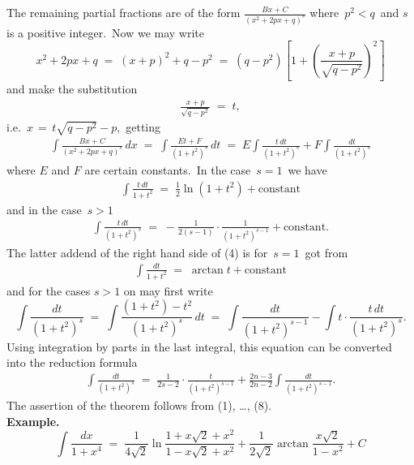 \documentclass[12pt]{article}
\theoremstyle{definition}
\begin{document}
The remaining partial fractions are of the form $\displaystyle\frac{Bx\!+\!C}{(x^2\!+\!2px\!+\!q)^s}$ where\, $p^2 < q$\, and $s$ is a positive integer.\, Now we may write 
$$x^2\!+\!2px\!+\!q \;=\; (x\!+\!p)^2\!+\!q\!-\!p^2 \;=\; (q\!-\!p^2)\!\left[1+\left(\!\frac{x\!+\!p}{\sqrt{q\!-\!p^2}}\!\right)^{\!2}\right]$$ and make the substitution
\begin{align}
\frac{x\!+\!p}{\sqrt{q\!-\!p^2}} \;=\; t,
\end{align}
i.e.\, $x \,=\, t\sqrt{q\!-\!p^2}\!-\!p$,\, getting
\begin{align}
\int\!\frac{Bx\!+\!C}{(x^2\!+\!2px\!+\!q)^s}\,dx \;=\; \int\!\frac{Et\!+\!F}{(1\!+\!t^2)^s}\,dt \;=\; 
E\!\int\!\frac{t\,dt}{(1\!+\!t^2)^s}+F\!\int\!\frac{dt}{(1\!+\!t^2)^s}
\end{align}
where $E$ and $F$ are certain constants.\, In the case \,$s = 1$\, we have
\begin{align}
\int\!\frac{t\,dt}{1\!+\!t^2} \;=\; \frac{1}{2}\ln(1\!+\!t^2)+\mbox{constant}
\end{align}
and in the case \,$s >1$
\begin{align}
\int\!\frac{t\,dt}{(1\!+\!t^2)^s} \;=\; -\frac{1}{2(s\!-\!1)}\!\cdot\!\frac{1}{(1\!+\!t^2)^{s-1}}+\mbox{constant}.
\end{align}
The latter addend of the right hand side of (4) is for\, $s = 1$\, got from
\begin{align}
\int\!\frac{dt}{1\!+\!t^2} \;=\; \arctan{t}+\mbox{constant}
\end{align}
and for the cases $s > 1$ on may first write 
$$\int\!\frac{dt}{(1\!+\!t^2)^s} \;=\; \int\!\frac{(1\!+\!t^2)\!-\!t^2}{(1\!+\!t^2)^s}\,dt \;=\;
\int\!\frac{dt}{(1\!+\!t^2)^{s-1}}-\int\!t\!\cdot\!\frac{t\,dt}{(1\!+\!t^2)^s}.$$ 
Using integration by parts in the last integral, this equation can be converted into the reduction formula
\begin{align}
\int\!\frac{dt}{(1\!+\!t^2)^s} \;=\; 
\frac{1}{2s\!-\!2}\!\cdot\!\frac{t}{(1\!+\!t^2)^{s-1}}+\frac{2n\!-\!3}{2n\!-\!2}\int\!\frac{dt}{(1\!+\!t^2)^{s-1}}.
\end{align}
The assertion of the theorem follows from (1), \ldots, (8).\\

\textbf{Example.}\, 
$$\int\!\frac{dx}{1\!+\!x^4} \;=\; \frac{1}{4\sqrt{2}}\ln\frac{1\!+\!x\sqrt{2}\!+\!x^2}{1\!-\!x\sqrt{2}\!+\!x^2}
+\frac{1}{2\sqrt{2}}\arctan\frac{x\sqrt{2}}{1\!-\!x^2}+C$$

\end{document}
